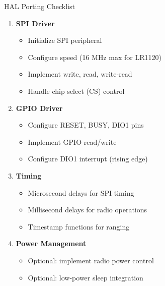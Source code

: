 \documentclass{beamer}
\begin{document}
\begin{frame}{HAL Porting Checklist}
\begin{enumerate}
    \item \textbf{SPI Driver}
    \begin{itemize}
        \item Initialize SPI peripheral
        \item Configure speed (16 MHz max for LR1120)
        \item Implement write, read, write-read
        \item Handle chip select (CS) control
    \end{itemize}

    \item \textbf{GPIO Driver}
    \begin{itemize}
        \item Configure RESET, BUSY, DIO1 pins
        \item Implement GPIO read/write
        \item Configure DIO1 interrupt (rising edge)
    \end{itemize}

    \item \textbf{Timing}
    \begin{itemize}
        \item Microsecond delays for SPI timing
        \item Millisecond delays for radio operations
        \item Timestamp functions for ranging
    \end{itemize}

    \item \textbf{Power Management}
    \begin{itemize}
        \item Optional: implement radio power control
        \item Optional: low-power sleep integration
    \end{itemize}
\end{enumerate}
\end{frame}
\end{document}
